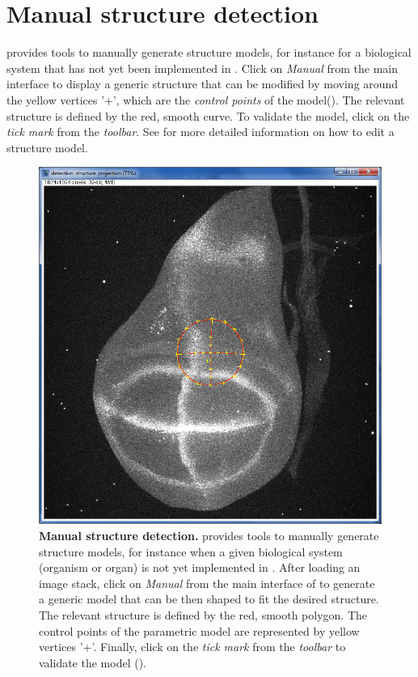 \section{Manual structure detection} \label{sec:manual_detection}
\wingj provides tools to manually generate structure models, for instance for a biological system that has not yet been implemented in \wingj. Click on \textit{Manual} from the main interface to display a generic structure that can be modified by moving around the yellow vertices '+', which are the \textit{control points} of the model(). The relevant structure is defined by the red, smooth curve. To validate the model, click on the \textit{tick mark} from the \textit{\ij toolbar}. See  for more detailed information on how to edit a structure model.\\

\begin{figure}[!h]
\centering
\includegraphics[scale=0.3]{images/wingj_structure_manual.jpg}
\caption{\textbf{Manual structure detection.} \wingj provides tools to manually generate structure models, for instance when a given biological system (organism or organ) is not yet implemented in \wingj. After loading an image stack, click on \textit{Manual} from the main interface of \wingj to generate a generic model that can be then shaped to fit the desired structure. The relevant structure is defined by the red, smooth polygon. The control points of the parametric model are represented by yellow vertices '+'. Finally, click on the \textit{tick mark} from the \textit{\ij toolbar} to validate the model ().}
\label{fig:wingj_structure_manual}
\end{figure}

